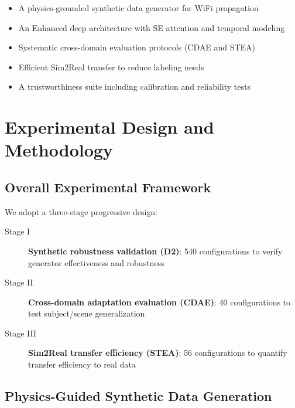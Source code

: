 \begin{itemize}
\item A physics-grounded synthetic data generator for WiFi propagation
\item An Enhanced deep architecture with SE attention and temporal modeling
\item Systematic cross-domain evaluation protocols (CDAE and STEA)
\item Efficient Sim2Real transfer to reduce labeling needs
\item A trustworthiness suite including calibration and reliability tests
\end{itemize}

\section{Experimental Design and Methodology}
\label{sec:methodology}

\subsection{Overall Experimental Framework}
\label{subsec:framework}

We adopt a three-stage progressive design:

\begin{description}
\item[Stage I] \textbf{Synthetic robustness validation (D2)}: 540 configurations to verify generator effectiveness and robustness
\item[Stage II] \textbf{Cross-domain adaptation evaluation (CDAE)}: 40 configurations to test subject/scene generalization
\item[Stage III] \textbf{Sim2Real transfer efficiency (STEA)}: 56 configurations to quantify transfer efficiency to real data
\end{description}

\subsection{Physics-Guided Synthetic Data Generation}
\label{subsec:physics_principles}

